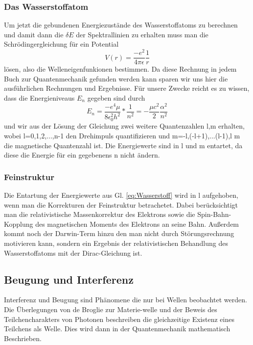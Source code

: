 \documentclass[]{article}
\begin{document}
\subsubsection{Das Wasserstoffatom}
Um jetzt die gebundenen Energiezustände des Wasserstoffatoms zu berechnen und damit dann die $\delta E$ der Spektrallinien zu erhalten muss man die Schrödingergleichung für ein Potential
\begin{equation}
	V(r)=\frac{-e^2}{4\pi \epsilon} \frac{1}{r}
\end{equation}
lösen, also die Welleneigenfunkionen bestimmen. Da diese Rechnung in jedem Buch zur Quantenmechanik gefunden werden kann sparen wir uns hier die ausführlichen Rechnungen und Ergebnisse. Für unsere Zwecke reicht es zu wissen, dass die Energieniveaus $E_{n}$ gegeben sind durch
\begin{equation}
\label{eq:Wasserstoff}
	E_{n}=\frac{-e^4\mu}{8\epsilon_0^2h^2}*\frac{1}{n^2}=-\frac{\mu c^2}{2}\frac{\alpha^2}{n^2}
\end{equation} und wir aus der Lösung der Gleichung zwei weitere Quantenzahlen l,m erhalten, wobei l=0,1,2,...,n-1 den Drehimpuls quantifizieren und m=-l,(-l+1),...(l-1),l m die magnetische Quantenzahl ist. Die Energiewerte sind in l und m entartet, da diese die Energie für ein gegebenens n nicht ändern.
\subsubsection{Feinstruktur}
Die Entartung der Energiewerte aus Gl. \ref{eq:Wasserstoff} wird in l aufgehoben, wenn man die Korrekturen der Feinstruktur betrachetet. Dabei berücksichtigt man die relativistische Massenkorrektur des Elektrons sowie die Spin-Bahn-Kopplung des magnetischen Moments des Elektrons an seine Bahn. Außerdem kommt noch der Darwin-Term hinzu den man nicht durch Störungsrechnung motivieren kann, sondern ein Ergebnis der relativistischen Behandlung des Wasserstoffatoms mit der Dirac-Gleichung ist. 

\subsection{Beugung und Interferenz} %
Interferenz und Beugung sind Phänomene die nur bei Wellen beobachtet werden. Die Überlegungen von de Broglie zur Materie-welle und der Beweis des Teilchencharakters von Photonen beschreiben die gleichzeitige Existenz eines Teilchens als Welle. Dies wird dann in der Quantenmechanik mathematisch Beschrieben. 
\end{document}
